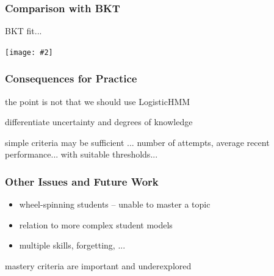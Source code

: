 \documentclass[bigger]{beamer}
\newcommand{\img}[2]{
  \begin{center}
    \texttt{[image: \#2]}
  \end{center}
}
\begin{document}
\begin{frame}
  \frametitle{Comparison with BKT}

  BKT fit...

  \img{.5}{hmm_bkt}
\end{frame}

\begin{frame}
  \frametitle{Consequences for Practice}

  the point is not that we should use LogisticHMM

  differentiate uncertainty and degrees of knowledge

  simple criteria may be sufficient ... number of attempts, average recent
  performance... with suitable thresholds...
\end{frame}

\begin{frame}
  \frametitle{Other Issues and Future Work}

  \begin{itemize}
  \item wheel-spinning students -- unable to master a topic
  \item relation to more complex student models
  \item multiple skills, forgetting, ...
  \end{itemize}

  \alert{mastery criteria are important and underexplored}
\end{frame}
\end{document}
